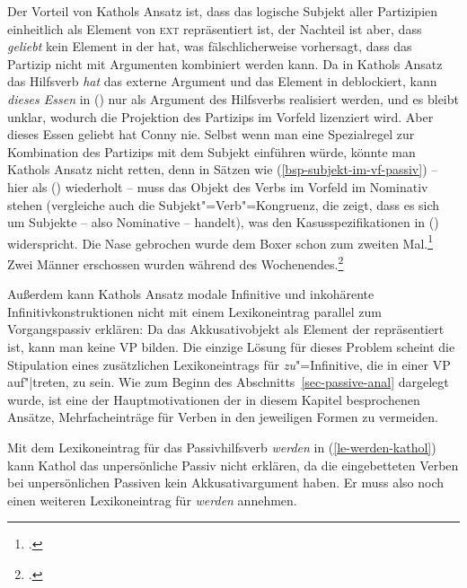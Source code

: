 {Der Vorteil von Kathols Ansatz ist, dass das logische Subjekt
aller Partizipien einheitlich als Element von \textsc{ext} repräsentiert ist,
der Nachteil ist aber, dass \emph{geliebt} kein Element in der \compsl hat,
was fälschlicherweise vorhersagt, dass das Partizip nicht mit Argumenten kombiniert
werden kann. Da in Kathols Ansatz das Hilfsverb \emph{hat} das externe Argument und das
Element in \subj deblockiert, kann \emph{dieses Essen} in () nur als Argument des Hilfsverbs
realisiert werden, und es bleibt unklar, wodurch die Projektion des Partizips im Vorfeld
lizenziert wird.
\ea
Aber dieses Essen geliebt hat Conny nie.
\z
Selbst wenn man eine Spezialregel zur Kombination des Partizips mit dem Subjekt einführen würde,
könnte man Kathols Ansatz nicht retten, denn in Sätzen wie (\ref{bsp-subjekt-im-vf-passiv}) -- hier als
() wiederholt -- muss das Objekt
des Verbs im Vorfeld im Nominativ stehen (vergleiche auch die Subjekt"=Verb"=Kongruenz, die zeigt,
dass es sich um Subjekte -- also Nominative -- handelt), was den Kasusspezifikationen in () widerspricht.
\eal
\label{bsp-subjekt-im-vf-passiv-zwei}
\ex{}
Die Nase gebrochen wurde dem Boxer schon zum zweiten Mal.\footnote{
        .
}
\ex{}
Zwei Männer erschossen wurden    während des Wochenendes.\footnote{
        .%
        }
\label{bsp-subjekt-im-vf-passiv-letzt-zwei}
\zl

\noindent
Außerdem kann Kathols Ansatz modale Infinitive 
und inkohärente Infinitivkonstruktionen nicht mit einem Lexikoneintrag parallel zum Vorgangspassiv
erklären:
Da das Akkusativobjekt als Element der \subjl repräsentiert ist, kann man keine VP
bilden. Die einzige Lösung für dieses Problem scheint die Stipulation eines zusätzlichen
Lexikoneintrags für \emph{zu}"=Infinitive, die in einer VP auf"|treten, zu sein.
Wie zum Beginn des Abschnitts~\ref{sec-passive-anal} dargelegt wurde, ist eine der Hauptmotivationen
der in diesem Kapitel besprochenen Ansätze, Mehrfacheinträge für Verben in den jeweiligen
Formen zu vermeiden.

Mit dem Lexikoneintrag für das Passivhilfsverb \emph{werden} in (\ref{le-werden-kathol}) 
kann Kathol das unpersönliche Passiv nicht erklären, da die eingebetteten Verben bei unpersönlichen Passiven kein
Akkusativargument haben. Er muss also noch einen weiteren Lexikoneintrag für \emph{werden}
annehmen.

}
